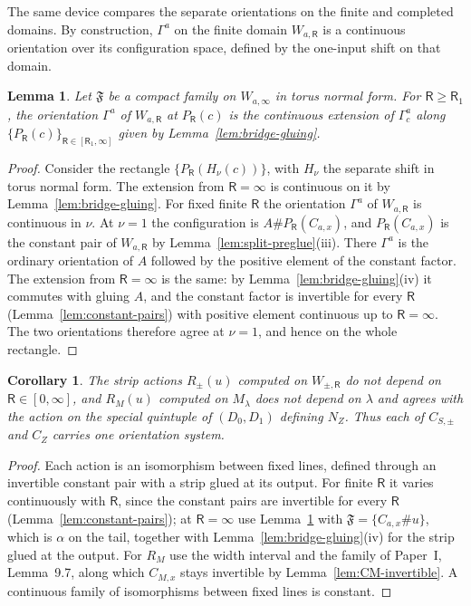 \documentclass[11pt]{amsart}
\newtheorem{lemma}[theorem]{Lemma}
\newtheorem{corollary}[theorem]{Corollary}
\theoremstyle{definition}
\theoremstyle{remark}
\theoremstyle{plain}
\numberwithin{equation}{section}
\begin{document}
The same device compares the separate orientations on the finite and
completed domains. By construction, $\Gamma^a$ on the finite domain
$W_{a,\mathsf R}$ is a continuous orientation over its configuration
space, defined by the one-input shift on that domain.

\begin{lemma}\label{lem:separate-completion}
Let $\mathfrak F$ be a compact family on $W_{a,\infty}$ in torus normal
form. For $\mathsf R\ge\mathsf R_1$, the orientation $\Gamma^a$ of
$W_{a,\mathsf R}$ at $P_{\mathsf R}(c)$ is the continuous extension of
$\Gamma^a_c$ along $\{P_{\mathsf R}(c)\}_{\mathsf R\in[\mathsf R_1,\infty]}$
given by Lemma~\ref{lem:bridge-gluing}.
\end{lemma}
\begin{proof}
Consider the rectangle $\{P_{\mathsf R}(H_\nu(c))\}$, with $H_\nu$ the
separate shift in torus normal form. The extension from
$\mathsf R=\infty$ is continuous on it by Lemma~\ref{lem:bridge-gluing}.
For fixed finite $\mathsf R$ the orientation $\Gamma^a$ of $W_{a,\mathsf R}$
is continuous in $\nu$. At $\nu=1$ the configuration is
$A\#P_{\mathsf R}(C_{a,x})$, and $P_{\mathsf R}(C_{a,x})$ is the constant
pair of $W_{a,\mathsf R}$ by Lemma~\ref{lem:split-preglue}(iii). There
$\Gamma^a$ is the ordinary orientation of $A$ followed by the positive
element of the constant factor. The extension from $\mathsf R=\infty$ is
the same: by Lemma~\ref{lem:bridge-gluing}(iv) it commutes with gluing
$A$, and the constant factor is invertible for every $\mathsf R$
(Lemma~\ref{lem:constant-pairs}) with
positive element continuous up to $\mathsf R=\infty$.
The two orientations therefore agree at $\nu=1$, and hence on the whole
rectangle.
\end{proof}

\begin{corollary}\label{cor:strip-actions}
The strip actions $R_\pm(u)$ computed on $W_{\pm,\mathsf R}$ do not depend
on $\mathsf R\in[0,\infty]$, and $R_M(u)$ computed on $M_\lambda$ does not
depend on $\lambda$ and agrees with the action on the special quintuple
of $(D_0,D_1)$ defining $N_Z$. Thus each of $C_{S,\pm}$ and $C_Z$ carries
one orientation system.
\end{corollary}
\begin{proof}
Each action is an isomorphism between fixed lines, defined through an
invertible constant pair with a strip glued at its output. For finite
$\mathsf R$ it varies continuously with $\mathsf R$, since the constant
pairs are invertible for every $\mathsf R$
(Lemma~\ref{lem:constant-pairs}); at $\mathsf R=\infty$ use
Lemma~\ref{lem:separate-completion} with $\mathfrak F=\{C_{a,x}\#u\}$,
which is $\alpha$ on the tail, together with
Lemma~\ref{lem:bridge-gluing}(iv) for the strip glued at the output. For $R_M$ use the width interval and the
family of Paper~I, Lemma~9.7, along which $C_{M,x}$ stays invertible
by Lemma~\ref{lem:CM-invertible}.
A continuous family of isomorphisms between fixed lines is constant.
\end{proof}
\end{document}
